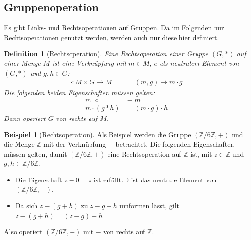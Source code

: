 \documentclass[12pt,a4paper, usenames, dvipsnames]{article}
\theoremstyle{mystyle}
\newtheorem{definition}{Definition}
\theoremstyle{definition}
\newtheorem{bsp}{Beispiel}[definition]
\begin{document}
%
%
%
%
%
%
%
%
%
%

\subsection*{Gruppenoperation} 

Es gibt Links- und Rechtsoperationen auf Gruppen. Da im Folgenden nur Rechtsoperationen genutzt werden, werden auch nur diese hier definiert.


\begin{definition}[Rechtsoperation]

Eine Rechtsoperation einer Gruppe $(G, *)$ auf einer Menge $M$ ist eine Verknüpfung mit $m \in M$, $e$ als neutralem Element von $(G,*)$ und $g,h \in G$:
\begin{align*}
\cdot: M \times G \rightarrow M \ \ \ \ \ \ \ \ \ \ \ \ \ \ \
(m, g) \mapsto m \cdot g 
\end{align*}
Die folgenden beiden Eigenschaften müssen gelten:
\begin{align*}
m \cdot e & = m \\
m \cdot (g * h) & = (m \cdot g) \cdot h
\end{align*}
Dann operiert $G$ von rechts auf $M$.

\end{definition}


\begin{bsp}[Rechtsoperation]

Als Beispiel werden die Gruppe $(\mathbb{Z}/6\mathbb{Z}, +)$ und die Menge $\mathbb{Z}$ mit der Verknüpfung $-$ betrachtet. Die folgenden Eigenschaften müssen gelten, damit $(\mathbb{Z}/6\mathbb{Z}, +)$ eine Rechtsoperation auf $\mathbb{Z}$ ist, mit $z \in  \mathbb{Z}$ und $g,h \in \mathbb{Z}/6\mathbb{Z}$.
\begin{itemize}
\item Die Eigenschaft $z - 0 = z$ ist erfüllt. $0$ ist das neutrale Element von $(\mathbb{Z}/6\mathbb{Z}, +)$.
\item Da sich $z-(g+h)$ zu $z-g-h$ umformen lässt, gilt $z-(g+h) = (z-g)-h$
\end{itemize}
Also operiert $(\mathbb{Z}/6\mathbb{Z}, +)$ mit $-$ von rechts auf $\mathbb{Z}$.

\end{bsp}

%
%
%
%
%
%
%
%
%
%
%
%
\end{document}
